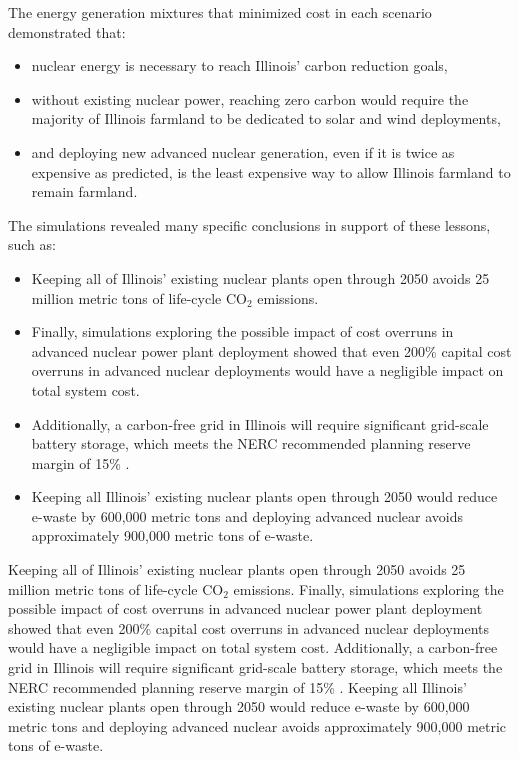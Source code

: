The energy generation mixtures that minimized cost in each scenario 
demonstrated that:
\begin{itemize}
        \item nuclear energy is necessary to reach Illinois' carbon reduction 
                goals,
        \item without existing nuclear power, reaching zero carbon would 
                require the majority of Illinois farmland to be dedicated to 
                solar and wind deployments,
        \item and deploying new advanced nuclear generation, even if it is 
                twice as expensive as predicted, is the least expensive way to 
                allow Illinois farmland to remain farmland.
  \end{itemize}

The simulations revealed many specific conclusions in support of these lessons, 
such as:
\begin{itemize}
        \item Keeping all of Illinois' existing nuclear plants open through 
                2050 avoids 25 million metric tons of life-cycle CO$_2$ emissions. 
        \item Finally, simulations exploring the possible impact of cost overruns in advanced nuclear power plant deployment showed that even 200\% capital cost overruns in advanced nuclear deployments would have a negligible impact on total system cost.
        \item Additionally, a carbon-free grid in Illinois will require significant grid-scale battery storage,  which meets the \gls{NERC} recommended planning reserve margin of 15\% \cite{nerc_reserve_margin}.
        \item Keeping all Illinois' existing nuclear plants open through 2050 would reduce e-waste by 600,000 metric tons and deploying advanced nuclear avoids approximately 900,000 metric tons of e-waste. 
\end{itemize}

Keeping all of Illinois' existing nuclear plants open through 2050 avoids 25 
million metric tons of life-cycle CO$_2$ emissions. 
Finally, simulations exploring the possible impact of cost overruns in advanced nuclear power plant deployment showed that even 200\% capital cost overruns in advanced nuclear deployments would have a negligible impact on total system cost.
Additionally, a carbon-free grid in Illinois will require significant grid-scale battery storage,  which meets the \gls{NERC} recommended planning reserve margin of 15\% \cite{nerc_reserve_margin}.
Keeping all Illinois' existing nuclear plants open through 2050 would reduce e-waste by 600,000 metric tons and deploying advanced nuclear avoids approximately 900,000 metric tons of e-waste. 

